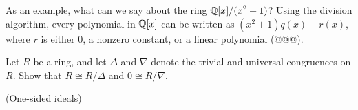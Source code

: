As an example, what can we say about the ring \(\mathbb{Q}[x]/(x^2 + 1)\)?
Using the division algorithm, every polynomial in \(\mathbb{Q}[x]\) can be written as \((x^2+1)q(x) + r(x)\), where \(r\) is either 0, a nonzero constant, or a linear polynomial (@@@).



\Exercises%

\begin{exercise}
Let \(R\) be a ring, and let \(\Delta\) and \(\nabla\) denote the trivial and universal congruences on \(R\).
Show that \(R \cong R/\Delta\) and \(0 \cong R/\nabla\).
\end{exercise}


\begin{exercise}
(One-sided ideals)
\end{exercise}

